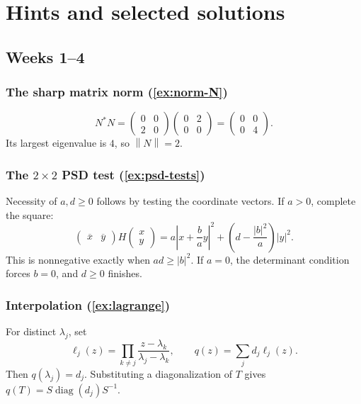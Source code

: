 \documentclass[11pt,oneside,openany]{book}
\theoremstyle{definition}
\theoremstyle{remark}
\newcommand{\diag}{\operatorname{diag}}
\newcommand{\norm}[1]{\left\lVert #1\right\rVert}
\begin{document}
\chapter{Hints and selected solutions}
\label{app:solutions}

\section{Weeks 1--4}

\subsection*{The sharp matrix norm (\cref{ex:norm-N})}

\[
  N^*N
  =
  \begin{pmatrix}0&0\\2&0\end{pmatrix}
  \begin{pmatrix}0&2\\0&0\end{pmatrix}
  =
  \begin{pmatrix}0&0\\0&4\end{pmatrix}.
\]
Its largest eigenvalue is \(4\), so \(\norm{N}=2\).

\subsection*{The \(2\times2\) PSD test (\cref{ex:psd-tests})}

Necessity of \(a,d\geq0\) follows by testing the coordinate vectors.
If \(a>0\), complete the square:
\[
  \begin{pmatrix}\overline x&\overline y\end{pmatrix}
  H\begin{pmatrix}x\\y\end{pmatrix}
  =
  a\left|x+\frac{b}{a}y\right|^2
  +\left(d-\frac{|b|^2}{a}\right)|y|^2.
\]
This is nonnegative exactly when \(ad\geq|b|^2\).  If \(a=0\), the
determinant condition forces \(b=0\), and \(d\geq0\) finishes.

\subsection*{Interpolation (\cref{ex:lagrange})}

For distinct \(\lambda_j\), set
\[
  \ell_j(z)=\prod_{k\neq j}
  \frac{z-\lambda_k}{\lambda_j-\lambda_k},
  \qquad
  q(z)=\sum_jd_j\ell_j(z).
\]
Then \(q(\lambda_j)=d_j\).  Substituting a diagonalization of \(T\)
gives \(q(T)=S\diag(d_j)S^{-1}\).
\end{document}
